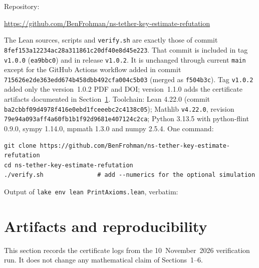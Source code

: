 \documentclass[11pt]{article}
\theoremstyle{remark}
\begin{document}
Repository:
\begin{center}\url{https://github.com/BenFrohman/ns-tether-key-estimate-refutation}\end{center}
The Lean sources, scripts and
\texttt{verify.sh} are exactly those of commit \texttt{8fef153a12234ac28a311861c20df40e8d45e223}.
That commit is included in tag \texttt{v1.0.0} (\texttt{ea9bbc0}) and in release \texttt{v1.0.2}.
It is unchanged through current \texttt{main} except for the GitHub Actions workflow added in
commit \texttt{715626e2de363edd674b458dbb492cfa004c5b03} (merged as \texttt{f504b3c}).
Tag \texttt{v1.0.2} added only the version~1.0.2 PDF and DOI; version~1.1.0 adds the certificate
artifacts documented in Section~\ref{sec:artifacts}. Toolchain: Lean 4.22.0 (commit \texttt{ba2cbbf09d4978f416e0ebd1fceeebc2c4138c05}); Mathlib
\texttt{v4.22.0}, revision \texttt{79e94a093aff4a60fb1b1f92d9681e407124c2ca}; Python 3.13.5 with python-flint 0.9.0,
sympy 1.14.0, mpmath 1.3.0 and numpy 2.5.4. One command:
\begin{verbatim}
git clone https://github.com/BenFrohman/ns-tether-key-estimate-refutation
cd ns-tether-key-estimate-refutation
./verify.sh               # add --numerics for the optional simulation
\end{verbatim}
Output of \texttt{lake env lean PrintAxioms.lean}, verbatim:
{\fontsize{6.5}{7.5}\selectfont
{}
}

\section{Artifacts and reproducibility}\label{sec:artifacts}
This section records the certificate logs from the 10~November~2026 verification run.
It does not change any mathematical claim of Sections~1--6.
\end{document}
